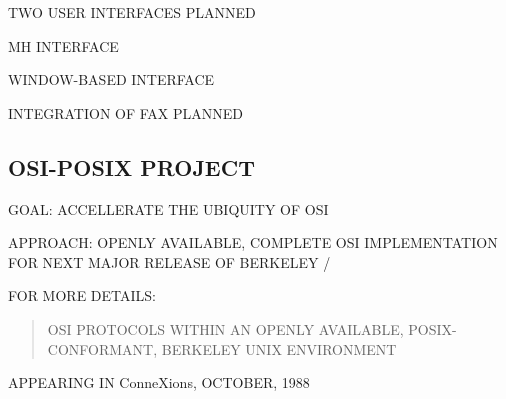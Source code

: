 \begin{bwslide}

\begin{nrtc}
\item	TWO USER INTERFACES PLANNED
    \begin{nrtc}
    \item	MH INTERFACE

    \item	WINDOW-BASED INTERFACE
    \end{nrtc}

\item	INTEGRATION OF FAX PLANNED
\end{nrtc}
\end{bwslide}


\begin{bwslide}
\part*	{OSI-POSIX PROJECT}\bf

\begin{nrtc}
\item	GOAL: ACCELLERATE THE UBIQUITY OF OSI

\item	APPROACH: OPENLY AVAILABLE, COMPLETE OSI IMPLEMENTATION FOR NEXT MAJOR
	RELEASE OF BERKELEY \unix/

\item	FOR MORE DETAILS:
\begin{quote}
OSI PROTOCOLS WITHIN AN OPENLY AVAILABLE, POSIX-CONFORMANT, BERKELEY UNIX
ENVIRONMENT
\end{quote}
APPEARING IN ConneXions, OCTOBER, 1988
\end{nrtc}
\end{bwslide}


\begin{bwslide}
\end{bwslide}


\begin{bwslide}
\end{bwslide}



